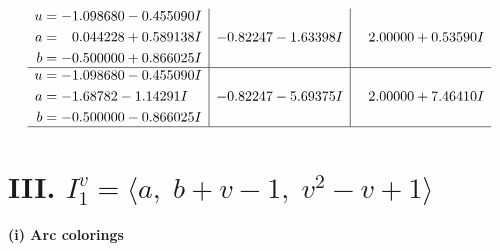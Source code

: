 \documentclass[1p]{elsarticle_modified}
\theoremstyle{definition}
\begin{document}
$$\begin{array}{c|c|c}
\begin{aligned}
u &= -1.098680 - 0.455090 I \\
a &= \phantom{-}0.044228 + 0.589138 I \\
b &= -0.500000 + 0.866025 I\end{aligned}
 & -0.82247 - 1.63398 I & \phantom{-}2.00000 + 0.53590 I \\ \hline\begin{aligned}
u &= -1.098680 - 0.455090 I \\
a &= -1.68782 - 1.14291 I \\
b &= -0.500000 - 0.866025 I\end{aligned}
 & -0.82247 - 5.69375 I & \phantom{-}2.00000 + 7.46410 I\\
 \hline 
 \end{array}$$\newpage\newpage\renewcommand{\arraystretch}{1}
\centering \section*{III. $I^v_{1}= \langle a,\;b+v-1,\;v^2- v+1 \rangle$}
\flushleft \textbf{(i) Arc colorings}\\
\end{document}
